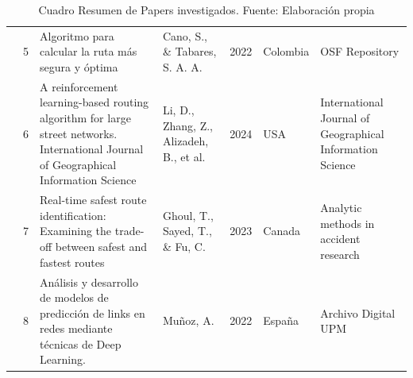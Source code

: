 \begin{table}[h]
\begin{tabular}{|m{0.5cm}|m{0.3cm}|m{4cm}|m{2cm}|m{0.6cm}|m{1.7cm}|m{3cm}|}
		\hline
		\multirow{4}{*}[-28ex]{\rotcell{\rlap{Técnica}}}                                          & 5                                             & Algoritmo para calcular la ruta más segura y óptima                   & Cano, S., \& Tabares, S. A. A.                                      & 2022                                       & Colombia                                        & OSF Repository  \\ 
		\cline{2-7}
		& 6                                             & A reinforcement learning-based routing algorithm for large street networks. International Journal of Geographical Information Science                                                    & Li, D., Zhang, Z., Alizadeh, B., et al.          & 2024                                        & USA                                        & International Journal of Geographical Information Science              \\ 
		\cline{2-7}
		& 7                                             & Real-time safest route identification: Examining the trade-off between safest and fastest routes & Ghoul, T., Sayed, T., \& Fu, C.             & 2023                                        & Canada                                         & Analytic methods in accident research              \\ 
		\cline{2-7}
		& 8                                             & Análisis y desarrollo de modelos de predicción de links en redes mediante técnicas de Deep Learning.  & Muñoz, A.                                    & 2022                                        & España                                          & Archivo Digital UPM                           \\
		\hline
	\end{tabular}
	\caption{Cuadro Resumen de Papers investigados. Fuente: Elaboración propia}
\label{A:table}
\end{table}




